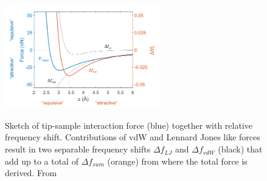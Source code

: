 \begin{figure}\centering
	\includegraphics[width=0.6\textwidth]{./images/AFM-graph-martin}
		\label{fig:AFM-force}
\caption{Sketch of tip-sample interaction force (blue) together with relative frequency shift. Contributions of vdW and Lennard Jones like forces result in two separable frequency shifts $\Delta f_{LJ}$ and $\Delta f_{vdW}$ (black) that add up to a total of $\Delta f_{sum}$ (orange) from where the total force is derived. From \cite{schwarz_assembly_2018}}
\label{fig:AFM-sketch}%
\end{figure}



%	

